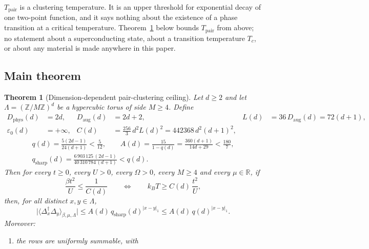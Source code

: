 \documentclass[11pt]{article}
\theoremstyle{plain}
\newtheorem{theorem}{Theorem}
\theoremstyle{definition}
\newcommand{\Dphys}{D_{\mathrm{phys}}}
\newcommand{\Daug}{D_{\mathrm{aug}}}
\newcommand{\Dop}{\Delta}
\begin{document}
$T_{\mathrm{pair}}$ is a clustering temperature. It is an upper threshold for
exponential decay of one two-point function, and it says nothing about the existence
of a phase transition at a critical temperature. Theorem~\ref{thm:main} below bounds
$T_{\mathrm{pair}}$ from above; no statement about a superconducting state, about a
transition temperature $T_c$, or about any material is made anywhere in this paper.

\subsection{Main theorem}

\begin{theorem}[Dimension-dependent pair-clustering ceiling]\label{thm:main}
Let $d\ge2$ and let $\Lambda=(\mathbb{Z}/M\mathbb{Z})^d$ be a hypercubic torus of
side $M\ge4$. Define
\begin{equation}\label{eq:constants}
 \begin{aligned}
 \Dphys(d)&=2d, & \Daug(d)&=2d+2, & L(d)&=36\,\Daug(d)=72(d+1),\\
 \varepsilon_0(d)&=+\infty, &
 C(d)&=\frac{256}{3}\,d^2L(d)^2=442368\,d^2(d+1)^2, & &
 \end{aligned}
\end{equation}
\begin{equation}\label{eq:constants2}
\begin{gathered}
 q(d)=\frac{5(2d-1)}{24(d+1)}<\frac{5}{12},\qquad
 A(d)=\frac{15}{1-q(d)}=\frac{360(d+1)}{14d+29}<\frac{180}{7},\\
 q_{\mathrm{sharp}}(d)=\frac{6\,903\,125\,(2d-1)}{40\,310\,784\,(d+1)}<q(d).
\end{gathered}
\end{equation}
Then for every $t\ge0$, every $U>0$, every $\Omega>0$, every $M\ge4$ and every
$\mu\in\mathbb{R}$, if
\begin{equation}\label{eq:hypothesis}
 \frac{\beta t^2}{U}\le\frac{1}{C(d)}
 \qquad\Longleftrightarrow\qquad
 k_BT\ge C(d)\,\frac{t^2}{U},
\end{equation}
then, for all distinct $x,y\in\Lambda$,
\begin{equation}\label{eq:mainbound}
 \bigl|\langle\Dop_x^\dagger\Dop_y\rangle_{\beta,\mu,\Lambda}\bigr|
 \le A(d)\,q_{\mathrm{sharp}}(d)^{|x-y|_1}
 \le A(d)\,q(d)^{|x-y|_1}.
\end{equation}
Moreover:
\begin{enumerate}
\item the rows are uniformly summable, with

\end{enumerate}
\end{theorem}
\end{document}
